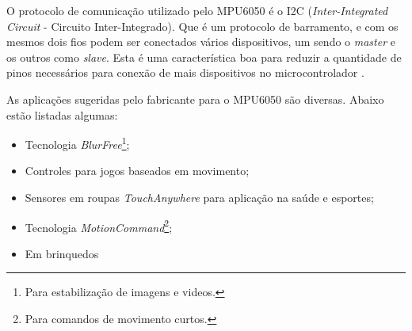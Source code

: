 	O protocolo de comunicação utilizado pelo MPU6050 é o I2C (\textit{Inter-Integrated Circuit} - Circuito Inter-Integrado). Que é um protocolo de barramento, e com os mesmos dois fios podem ser conectados vários dispositivos, um sendo o \textit{master} e os outros como \textit{slave}. Esta é uma característica boa para reduzir a quantidade de pinos necessários para conexão de mais dispositivos no microcontrolador \cite{mpu6050}.
	
	As aplicações sugeridas pelo fabricante para o MPU6050 são diversas. Abaixo estão listadas algumas:
	\begin{itemize}
		\item Tecnologia \textit{ BlurFree\texttrademark }\footnote{Para estabilização de imagens e videos.};
		\item Controles para jogos baseados em movimento;
		\item Sensores em roupas \textit{TouchAnywhere} para aplicação na saúde e esportes;
		\item Tecnologia \textit{ MotionCommand\texttrademark}\footnote{Para comandos de movimento curtos.}; 
		\item Em brinquedos
	\end{itemize}
	
